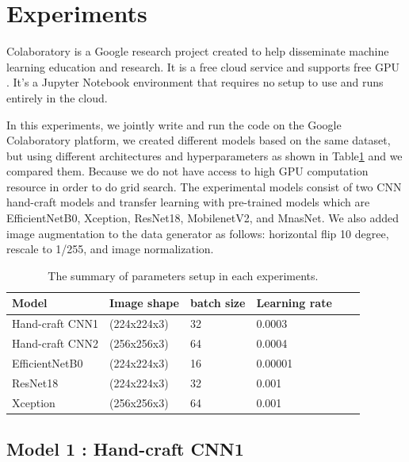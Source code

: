 \documentclass[conference]{IEEEtran}
\begin{document}
\section{Experiments}
Colaboratory is a Google research project created to help disseminate machine learning education and research. It is a free cloud service and supports free GPU . It's a Jupyter Notebook environment that requires no setup to use and runs entirely in the cloud.

In this experiments, we jointly write and run the code on the Google Colaboratory platform, we created different models based on the same dataset, but using different architectures and hyperparameters as shown in Table\ref{T1} and we compared them. Because we do not have access to high GPU computation resource in order to do grid search. The experimental models consist of two CNN hand-craft models and transfer learning with pre-trained models which are EfficientNetB0, Xception, ResNet18, MobilenetV2, and MnasNet. We also added image augmentation to the data generator as follows: horizontal flip 10 degree, rescale to 1/255, and image normalization. 

\begin{table}[h]\centering
\caption{The summary of parameters setup in each experiments.}\label{T1}
\begin{tabularx}{\linewidth}{l l l l l l}
\toprule
Model&Image shape&batch size&Learning rate\\
\midrule
Hand-craft CNN1&(224x224x3)&32&0.0003\\
Hand-craft CNN2&(256x256x3)&64& 0.0004\\
EfficientNetB0&(224x224x3)&16& 0.00001\\
ResNet18&(224x224x3)&32& 0.001\\
Xception&(256x256x3)&64& 0.001\\
\bottomrule
\end{tabularx}
\end{table}


\subsection{Model 1 : Hand-craft CNN1}
\end{document}
